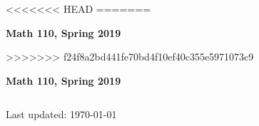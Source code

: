 \documentclass[12pt,letterpaper]{scrartcl}
\begin{document}
<<<<<<< HEAD
=======
\centerline{\large \textbf{Math 110, Spring 2019}} 
\vskip 0.6cm
>>>>>>> f24f8a2bd441fe70bd4f10ef40c355e5971073c9
\thispagestyle{empty}
$ $
\vfill
\begin{center}
\centerline{\huge \textbf{Math 110, Spring 2019}} 
\end{center}
\vfill
$ $
\newpage
\tableofcontents
\newpage
 \vfill
 \vfill
 \vfill
 \vfill
 \vfill
 \vfill
 \vfill
% 
\begin{center} 
    Last updated: \today
\end{center} \vfill
\end{document}
